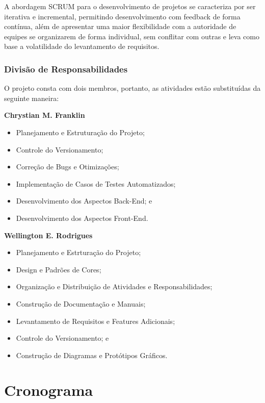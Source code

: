 \documentclass[a4paper,12pt]{article}
\begin{document}
A abordagem SCRUM para o desenvolvimento de projetos se caracteriza por ser iterativa e incremental, permitindo desenvolvimento com feedback de forma contínua, além de apresentar uma maior flexibilidade com a autoridade de equipes se organizarem de forma individual, sem conflitar com outras e leva como base a volatilidade do levantamento de requisitos.

\subsubsection{Divisão de Responsabilidades}
O projeto consta com dois membros, portanto, as atividades estão substituídas da seguinte maneira:

\vspace{2em}
\textbf{Chrystian M. Franklin}
\begin{itemize}
    	\item Planejamento e Estruturação do Projeto;
    	\item Controle do Versionamento;
    	\item Correção de Bugs e Otimizações;
    	\item Implementação de Casos de Testes Automatizados;
    	\item Desenvolvimento dos Aspectos Back-End; e
    	\item Desenvolvimento dos Aspectos Front-End.
\end{itemize}

\vspace{2em}
\textbf{Wellington E. Rodrigues}
\begin{itemize}
	\item Planejamento e Estrturação do Projeto;
    	\item Design e Padrões de Cores;
    	\item Organização e Distribuição de Atividades e Responsabilidades;
    	\item Construção de Documentação e Manuais;
   	\item Levantamento de Requisitos e Features Adicionais;
    	\item Controle do Versionamento; e
    	\item Construção de Diagramas e Protótipos Gráficos.

\end{itemize}

\section{Cronograma}
\end{document}
